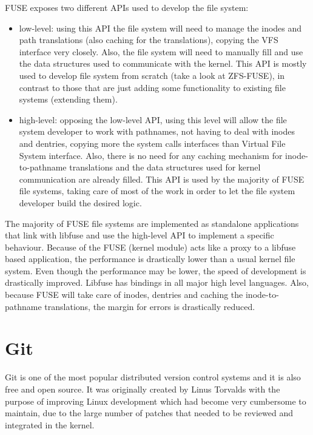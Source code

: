         FUSE exposes two different APIs used to develop the file system:
        \begin{itemize}
            \item low-level: using this API the file system will need to manage the inodes and path translations (also caching for the translations), copying the VFS interface very closely. Also, the file system will need to manually fill and use the data structures used to communicate with the kernel. This API is mostly used to develop file system from scratch (take a look at ZFS-FUSE), in contrast to those that are just adding some functionality to existing file systems (extending them).
            \item high-level: opposing the low-level API, using this level will allow the file system developer to work with pathnames, not having to deal with inodes and dentries, copying more the system calls interfaces than Virtual File System interface. Also, there is no need for any caching mechanism for inode-to-pathname translations and the data structures used for kernel communication are already filled. This API is used by the majority of FUSE file systems, taking care of most of the work in order to let the file system developer build the desired logic.
        \end{itemize}

        The majority of FUSE file systems are implemented as standalone applications that link with libfuse and use the high-level API to implement a specific behaviour. Because of the FUSE (kernel module) acts like a proxy to a libfuse based application, the performance is drastically lower than a usual kernel file system. Even though the performance may be lower, the speed of development is drastically improved. Libfuse has bindings in all major high level languages. Also, because FUSE will take care of inodes, dentries and caching the inode-to-pathname translations, the margin for errors is drastically reduced.

\section{Git}
    Git is one of the most popular distributed version control systems and it is also free and open source. It was originally created by Linus Torvalds with the purpose of improving Linux development which had become very cumbersome to maintain, due to the large number of patches that needed to be reviewed and integrated in the kernel.

